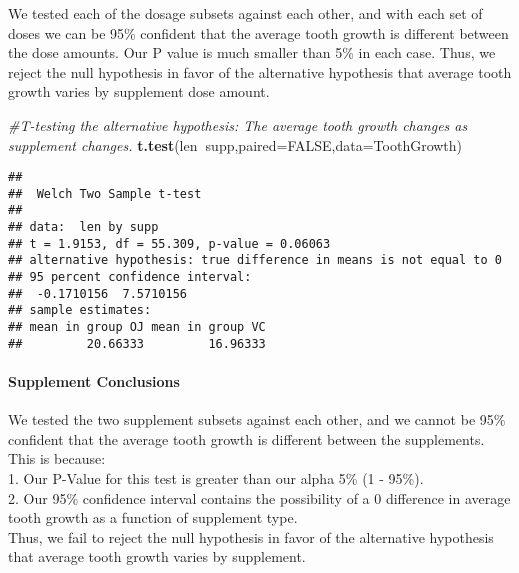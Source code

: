 \documentclass[]{article}
\newenvironment{Shaded}{\begin{snugshade}}{\end{snugshade}}
\newcommand{\KeywordTok}[1]{\textcolor[rgb]{0.13,0.29,0.53}{\textbf{#1}}}
\newcommand{\DataTypeTok}[1]{\textcolor[rgb]{0.13,0.29,0.53}{#1}}
\newcommand{\CommentTok}[1]{\textcolor[rgb]{0.56,0.35,0.01}{\textit{#1}}}
\newcommand{\OtherTok}[1]{\textcolor[rgb]{0.56,0.35,0.01}{#1}}
\newcommand{\OperatorTok}[1]{\textcolor[rgb]{0.81,0.36,0.00}{\textbf{#1}}}
\newcommand{\NormalTok}[1]{#1}
\let\oldparagraph\paragraph
\renewcommand{\paragraph}[1]{\oldparagraph{#1}\mbox{}}
\begin{document}
We tested each of the dosage subsets against each other, and with each
set of doses we can be 95\% confident that the average tooth growth is
different between the dose amounts. Our P value is much smaller than 5\%
in each case. Thus, we reject the null hypothesis in favor of the
alternative hypothesis that average tooth growth varies by supplement
dose amount.

\begin{Shaded}
\begin{Highlighting}[]
\CommentTok{#T-testing the alternative hypothesis: The average tooth growth changes as supplement changes.}
\KeywordTok{t.test}\NormalTok{(len}\OperatorTok{~}\NormalTok{supp,}\DataTypeTok{paired=}\OtherTok{FALSE}\NormalTok{,}\DataTypeTok{data=}\NormalTok{ToothGrowth)}
\end{Highlighting}
\end{Shaded}

\begin{verbatim}
## 
##  Welch Two Sample t-test
## 
## data:  len by supp
## t = 1.9153, df = 55.309, p-value = 0.06063
## alternative hypothesis: true difference in means is not equal to 0
## 95 percent confidence interval:
##  -0.1710156  7.5710156
## sample estimates:
## mean in group OJ mean in group VC 
##         20.66333         16.96333
\end{verbatim}

\paragraph{Supplement Conclusions}\label{supplement-conclusions}

We tested the two supplement subsets against each other, and we cannot
be 95\% confident that the average tooth growth is different between the
supplements. This is because:\\
1. Our P-Value for this test is greater than our alpha 5\% (1 - 95\%).\\
2. Our 95\% confidence interval contains the possibility of a 0
difference in average tooth growth as a function of supplement type.\\
Thus, we fail to reject the null hypothesis in favor of the alternative
hypothesis that average tooth growth varies by supplement.
\end{document}
